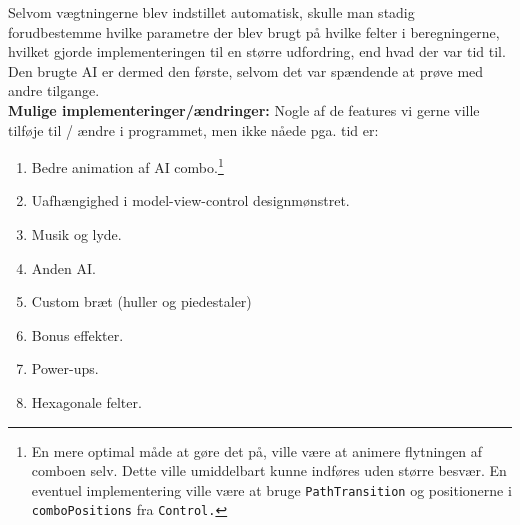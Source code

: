 Selvom vægtningerne blev indstillet automatisk, skulle man stadig forudbestemme hvilke parametre der blev brugt på hvilke felter i beregningerne, hvilket gjorde implementeringen til en større udfordring, end hvad der var tid til. Den brugte AI er dermed den første, selvom det var spændende at prøve med andre tilgange.  \\

\textbf{Mulige implementeringer/ændringer:} 
Nogle af de features vi gerne ville tilføje til / ændre i programmet, men ikke nåede pga. tid er:

\begin{enumerate}
\item Bedre animation af AI combo.\footnote{ En mere optimal måde at gøre det på, ville være at animere flytningen af comboen selv. Dette ville umiddelbart kunne indføres uden større besvær. En eventuel implementering ville være at bruge \texttt{PathTransition} og positionerne i \texttt{comboPositions} fra \texttt{Control.}}
\item Uafhængighed i model-view-control designmønstret.
\item Musik og lyde.
\item Anden AI.
\item Custom bræt (huller og piedestaler)
\item Bonus effekter.
\item Power-ups.
\item Hexagonale felter.
\end{enumerate}
